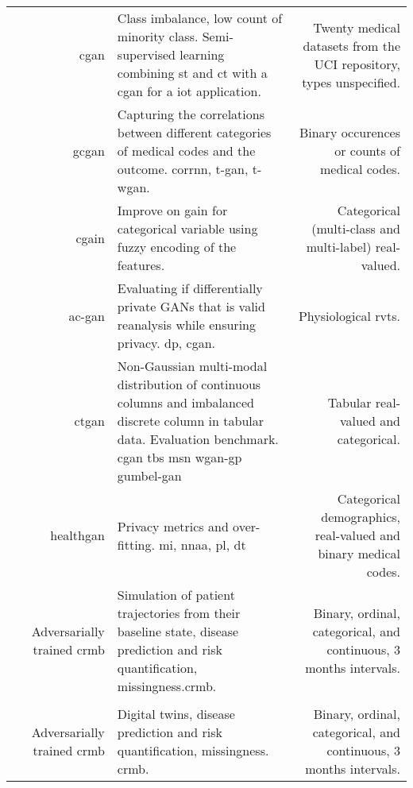 \begin{center}
\begin{longtable}[l]{@{}p{}NMR@{}}
        \citeauthor{Yang_2019_cdss} & \gls{cgan}
        & Class imbalance, low count of minority class. Semi-supervised learning combining \gls{st} and \gls{ct} with a \gls{cgan} for a \gls{iot} application.
        & Twenty medical datasets from the UCI repository, types unspecified.\\
        
        \citeauthor{Yang_2019_ehr} & \gls{gcgan}
        & Capturing the correlations between different categories of medical codes and the outcome.  \gls{corrnn}, \gls{t-gan}, \gls{t-wgan}.
        & Binary occurences or counts of medical codes.\\
        
        \citeauthor{Yang_2019_impute_ehr} & \gls{cgain}
        & Improve on \gls{gain} for categorical variable using fuzzy encoding of the features. 
        & Categorical (multi-class and multi-label) real-valued.\\
        
        \citeauthor{Beaulieu-Jones2019-ct} & \gls{ac-gan} 
        & Evaluating if differentially private GANs that is valid reanalysis while ensuring privacy.  \gls{dp}, \gls{cgan}.
        & Physiological \gls{rvts}.\\
        
        \citeauthor{Xu2019-ay} & \gls{ctgan}
        & Non-Gaussian multi-modal distribution of continuous columns and imbalanced discrete column in tabular data. Evaluation benchmark.  \gls{cgan} \gls{tbs} \gls{msn} \gls{wgan-gp} \gls{gumbel-gan}
        & Tabular real-valued and categorical.\\
        
        \citeauthor{yale2019ESANN} & \gls{healthgan}
        & Privacy metrics and over-fitting.  \gls{mi}, \gls{nnaa}, \gls{pl}, \gls{dt}
        & Categorical demographics, real-valued and binary medical codes.\\
        
        \citeauthor{Fisher2019} & Adversarially trained \gls{crmb}
        & Simulation of patient trajectories from their baseline state, disease prediction and risk quantification, missingness.\gls{crmb}.
        &  Binary, ordinal, categorical, and continuous, 3 months intervals.\\
        
        \hline
         & & & \\
        \hline
        
        \citeauthor{walsh2020generating} & Adversarially trained \gls{crmb}
        & Digital twins, disease prediction and risk quantification, missingness.   \gls{crmb}.
        & Binary, ordinal, categorical, and continuous, 3 months intervals.\\
        

\end{longtable}
\end{center}
